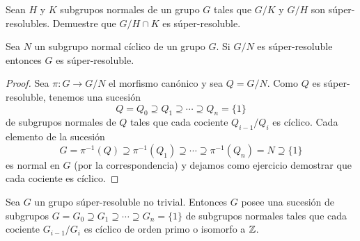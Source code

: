 \begin{exercise}
	Sean $H$ y $K$ subgrupos normales de un grupo $G$ tales que $G/K$ y $G/H$
	son súper-resolubles. Demuestre que $G/H\cap K$ es súper-resoluble.
\end{exercise}


\begin{proposition}
	\label{proposition:Nciclico}
	Sea $N$ un subgrupo normal cíclico de un grupo $G$. Si $G/N$ es
	súper-resoluble entonces $G$ es súper-resoluble.
\end{proposition}


\begin{proof}
	Sea $\pi\colon G\to G/N$ el morfismo canónico y sea $Q=G/N$. Como $Q$ es
	súper-resoluble, tenemos una sucesión
	\[
		Q=Q_0\supseteq Q_1\supseteq \cdots\supseteq Q_n=\{1\}
	\]
	de subgrupos normales de $Q$ tales que cada cociente $Q_{i-1}/Q_i$ es
	cíclico. Cada elemento de la sucesión
	\[
	G=\pi^{-1}(Q)\supseteq\pi^{-1}(Q_1)\supseteq\cdots\supseteq \pi^{-1}(Q_n)=N\supseteq \{1\}
	\]
	es normal en $G$ (por la correspondencia) y dejamos como 
	ejercicio demostrar que cada cociente es cíclico. 
\end{proof}

\begin{theorem}
	\label{theorem:ZorCp}
	Sea $G$ un grupo súper-resoluble no trivial. Entonces $G$ posee una sucesión
	de subgrupos $G=G_0\supseteq G_1\supseteq\cdots\supseteq G_n=\{1\}$ de
	subgrupos normales tales que cada cociente $G_{i-1}/G_i$ es cíclico de
	orden primo o isomorfo a $\mathbb{Z}$.
\end{theorem}

